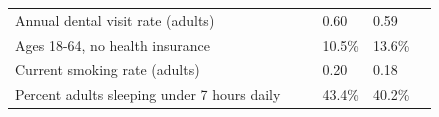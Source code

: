 \documentclass[9pt]{report}
\begin{document}
\begin{tabular}{p{.10in}p{.10in}p{.10in}p{3.7in}>{\hfill}p{.85in}>{\hfill}p{.85in}>{\hfill}p{.85in}>{\hfill}p{.85in}p{0.1in}}
\multicolumn{4}{l}{\parbox{3.6in}{\strut\raggedright{{Annual dental visit rate (adults)}}\strut}} &  &  & 0.60 & 0.59 & \multicolumn{1}{l}{}  \\ 
\multicolumn{4}{l}{\parbox{3.6in}{\strut\raggedright{{Ages 18-64, no health insurance}}\strut}} &  &  & 10.5\% & 13.6\% & \multicolumn{1}{l}{}  \\ 
\multicolumn{4}{l}{\parbox{3.6in}{\strut\raggedright{{Current smoking rate (adults)}}\strut}} &  &  & 0.20 & 0.18 & \multicolumn{1}{l}{}  \\ 
\multicolumn{4}{l}{\parbox{3.6in}{\strut\raggedright{{Percent adults sleeping under 7 hours daily}}\strut}} &  &  & 43.4\% & 40.2\% & \multicolumn{1}{l}{}  \\ 

\end{tabular}
\setlength{\tabcolsep}{6pt} %


\vspace{36pt}
\linespread{1.5}
\theendnotes
\end{document}
